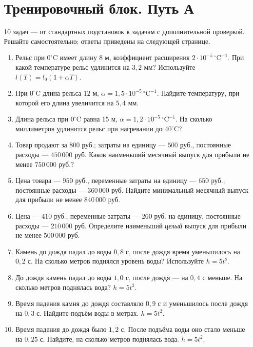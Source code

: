 \documentclass[a4paper,12pt]{article}
\begin{document}
\section*{Тренировочный блок. Путь А}
\textcolor{muted}{10 задач --- от стандартных подстановок к задачам с дополнительной проверкой. Решайте самостоятельно; ответы приведены на следующей странице.}
\vspace{0.10cm}
\begin{enumerate}[label=\textbf{\arabic*.},leftmargin=1.55em,itemsep=13pt,parsep=0pt]
\item Рельс при $0^\circ\text{C}$ имеет длину $8$ м, коэффициент расширения $2\cdot10^{-5}\,{}^\circ\text{C}^{-1}$. При какой температуре рельс удлинится на $3{,}2$ мм? Используйте $l(T)=l_0(1+\alpha T)$.
\item При $0^\circ\text{C}$ длина рельса $12$ м, $\alpha=1{,}5\cdot10^{-5}\,{}^\circ\text{C}^{-1}$. Найдите температуру, при которой его длина увеличится на $5{,}4$ мм.
\item Длина рельса при $0^\circ\text{C}$ равна $15$ м, $\alpha=1{,}2\cdot10^{-5}\,{}^\circ\text{C}^{-1}$. На сколько миллиметров удлинится рельс при нагревании до $40^\circ\text{C}$?
\item Товар продают за $800$ руб.; затраты на единицу --- $500$ руб., постоянные расходы --- $450\,000$ руб. Каков наименьший месячный выпуск для прибыли не менее $750\,000$ руб.?
\item Цена товара --- $950$ руб., переменные затраты на единицу --- $650$ руб., постоянные расходы --- $360\,000$ руб. Найдите минимальный месячный выпуск для прибыли не менее $840\,000$ руб.
\item Цена --- $410$ руб., переменные затраты --- $260$ руб. на единицу, постоянные расходы --- $210\,000$ руб. Определите наименьший \emph{целый} выпуск для прибыли не менее $500\,000$ руб.
\item Камень до дождя падал до воды $0{,}8$ с, после дождя время уменьшилось на $0{,}2$ с. На сколько метров поднялся уровень воды? Используйте $h=5t^2$.
\item До дождя камень падал до воды $1{,}0$ с, после дождя --- на $0{,}4$ с меньше. На сколько метров поднялась вода? $h=5t^2$.
\item Время падения камня до дождя составляло $0{,}9$ с и уменьшилось после дождя на $0{,}3$ с. Найдите подъём воды в метрах. $h=5t^2$.
\item Время падения до дождя было $1{,}2$ с. После подъёма воды оно стало меньше на $0{,}25$ с. Найдите, на сколько метров поднялась вода. $h=5t^2$.
\end{enumerate}
\clearpage
\end{document}
